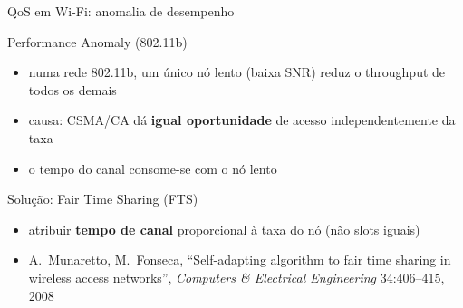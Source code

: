 \documentclass[aspectratio=169,11pt]{beamer}
\begin{document}
\begin{frame}{QoS em Wi-Fi: anomalia de desempenho}
  \begin{block}{Performance Anomaly (802.11b)}
    \begin{itemize}
      \item numa rede 802.11b, um único nó lento (baixa SNR) reduz o throughput de todos os demais
      \item causa: CSMA/CA dá \textbf{igual oportunidade} de acesso independentemente da taxa
      \item o tempo do canal consome-se com o nó lento
    \end{itemize}
  \end{block}
  \begin{exampleblock}{Solução: Fair Time Sharing (FTS)}
    \begin{itemize}
      \item atribuir \textbf{tempo de canal} proporcional à taxa do nó (não slots iguais)
      \item A.\ Munaretto, M.\ Fonseca, ``Self-adapting algorithm to fair time sharing in wireless access networks'', \emph{Computers \& Electrical Engineering} 34:406--415, 2008
    \end{itemize}
  \end{exampleblock}
\end{frame}
\end{document}
